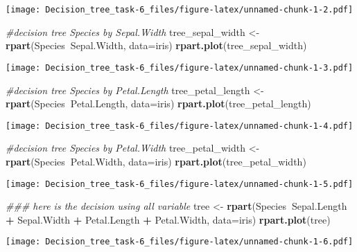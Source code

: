\documentclass[
]{article}
\newenvironment{Shaded}{\begin{snugshade}}{\end{snugshade}}
\newcommand{\CommentTok}[1]{\textcolor[rgb]{0.56,0.35,0.01}{\textit{#1}}}
\newcommand{\DataTypeTok}[1]{\textcolor[rgb]{0.13,0.29,0.53}{#1}}
\newcommand{\KeywordTok}[1]{\textcolor[rgb]{0.13,0.29,0.53}{\textbf{#1}}}
\newcommand{\NormalTok}[1]{#1}
\newcommand{\OperatorTok}[1]{\textcolor[rgb]{0.81,0.36,0.00}{\textbf{#1}}}
\newcommand{\StringTok}[1]{\textcolor[rgb]{0.31,0.60,0.02}{#1}}
\begin{document}
\texttt{[image: Decision\_tree\_task-6\_files/figure-latex/unnamed-chunk-1-2.pdf]}

\begin{Shaded}
\begin{Highlighting}[]
\CommentTok{#decision tree Species by Sepal.Width}
\NormalTok{tree_sepal_width <-}\StringTok{ }\KeywordTok{rpart}\NormalTok{(Species}\OperatorTok{~}\NormalTok{Sepal.Width, }\DataTypeTok{data=}\NormalTok{iris)}
\KeywordTok{rpart.plot}\NormalTok{(tree_sepal_width)}
\end{Highlighting}
\end{Shaded}

\texttt{[image: Decision\_tree\_task-6\_files/figure-latex/unnamed-chunk-1-3.pdf]}

\begin{Shaded}
\begin{Highlighting}[]
\CommentTok{#decision tree Species by Petal.Length}
\NormalTok{tree_petal_length <-}\StringTok{ }\KeywordTok{rpart}\NormalTok{(Species}\OperatorTok{~}\NormalTok{Petal.Length, }\DataTypeTok{data=}\NormalTok{iris)}
\KeywordTok{rpart.plot}\NormalTok{(tree_petal_length)}
\end{Highlighting}
\end{Shaded}

\texttt{[image: Decision\_tree\_task-6\_files/figure-latex/unnamed-chunk-1-4.pdf]}

\begin{Shaded}
\begin{Highlighting}[]
\CommentTok{#decision tree Species by Petal.Width}
\NormalTok{tree_petal_width <-}\StringTok{ }\KeywordTok{rpart}\NormalTok{(Species}\OperatorTok{~}\NormalTok{Petal.Width, }\DataTypeTok{data=}\NormalTok{iris)}
\KeywordTok{rpart.plot}\NormalTok{(tree_petal_width)}
\end{Highlighting}
\end{Shaded}

\texttt{[image: Decision\_tree\_task-6\_files/figure-latex/unnamed-chunk-1-5.pdf]}

\begin{Shaded}
\begin{Highlighting}[]
\CommentTok{### here is the decision using all variable}
\NormalTok{tree <-}\StringTok{ }\KeywordTok{rpart}\NormalTok{(Species}\OperatorTok{~}\NormalTok{Sepal.Length }\OperatorTok{+}\StringTok{ }\NormalTok{Sepal.Width }\OperatorTok{+}\StringTok{ }\NormalTok{Petal.Length }\OperatorTok{+}\StringTok{ }\NormalTok{Petal.Width, }\DataTypeTok{data=}\NormalTok{iris)}
\KeywordTok{rpart.plot}\NormalTok{(tree)}
\end{Highlighting}
\end{Shaded}

\texttt{[image: Decision\_tree\_task-6\_files/figure-latex/unnamed-chunk-1-6.pdf]}
\end{document}
